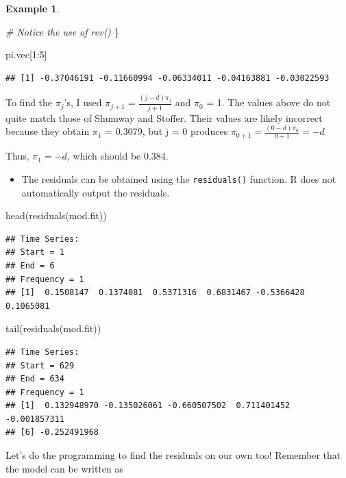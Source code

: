 \documentclass[
]{book}
\newenvironment{Shaded}{\begin{snugshade}}{\end{snugshade}}
\newcommand{\CommentTok}[1]{\textcolor[rgb]{0.56,0.35,0.01}{\textit{#1}}}
\newcommand{\DecValTok}[1]{\textcolor[rgb]{0.00,0.00,0.81}{#1}}
\newcommand{\FunctionTok}[1]{\textcolor[rgb]{0.00,0.00,0.00}{#1}}
\newcommand{\NormalTok}[1]{#1}
\newcommand{\SpecialCharTok}[1]{\textcolor[rgb]{0.00,0.00,0.00}{#1}}
\providecommand{\tightlist}{%
  \setlength{\itemsep}{0pt}\setlength{\parskip}{0pt}}
\theoremstyle{definition}
\theoremstyle{definition}
\newtheorem{example}{Example}[chapter]
\theoremstyle{definition}
\theoremstyle{definition}
\theoremstyle{remark}
\begin{document}
\begin{example}
\begin{Shaded}
\begin{Highlighting}[]
      \CommentTok{\# Notice the use of rev()}
\NormalTok{    \}}


\NormalTok{pi.vec[}\DecValTok{1}\SpecialCharTok{:}\DecValTok{5}\NormalTok{]}
\end{Highlighting}
\end{Shaded}

\begin{verbatim}
## [1] -0.37046191 -0.11660994 -0.06334011 -0.04163881 -0.03022593
\end{verbatim}

To find the \(\pi_j\)'s, I used \(\pi_{j+1}=\frac{(j-d)\pi_j}{j+1}\) and \(\pi_0\) = 1. The values above do not quite match those of Shumway and Stoffer. Their values are likely incorrect because they obtain \(\pi_1\) = 0.3079, but j = 0 produces \(\pi_{0+1}=\frac{(0-d)\pi_0}{0+1}=-d\)

Thus, \(\pi_1=-d\), which should be 0.384.

\begin{itemize}
\tightlist
\item
  The residuals can be obtained using the \texttt{residuals()} function. R does not automatically output the residuals.
\end{itemize}

\begin{Shaded}
\begin{Highlighting}[]
\FunctionTok{head}\NormalTok{(}\FunctionTok{residuals}\NormalTok{(mod.fit))}
\end{Highlighting}
\end{Shaded}

\begin{verbatim}
## Time Series:
## Start = 1 
## End = 6 
## Frequency = 1 
## [1]  0.1508147  0.1374081  0.5371316  0.6831467 -0.5366428  0.1065081
\end{verbatim}

\begin{Shaded}
\begin{Highlighting}[]
\FunctionTok{tail}\NormalTok{(}\FunctionTok{residuals}\NormalTok{(mod.fit))}
\end{Highlighting}
\end{Shaded}

\begin{verbatim}
## Time Series:
## Start = 629 
## End = 634 
## Frequency = 1 
## [1]  0.132948970 -0.135026061 -0.660507502  0.711401452 -0.001857311
## [6] -0.252491968
\end{verbatim}

Let's do the programming to find the residuals on our own too! Remember that the model can be written as


\end{example}
\end{document}
